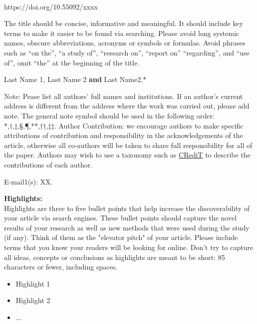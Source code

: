 \documentclass{ELSP}
\begin{document}
\begin{flushleft}
{\sffamily \small {}}\\
{\sffamily\small{https://doi.org/10.55092/xxxx}}


\newcontent The title should be concise, informative and meaningful. It should
include key terms to make it easier to be found via searching. Please
avoid long systemic names, obscure abbreviations, acronyms or symbols or
formulas. Avoid phrases such as ``on the'', ``a study of'', ``research
on'', ``report on'' ``regarding'', and ``use of'', omit ``the'' at the
beginning of the title.

 {Last Name} {1},
 {Last Name} {2}
\textbf{and} 
 {Last Name}{2,}{*}


\newcontent Note: Pease list all authors' full names and institutions. If an
author's current address is different from the address where the work
was carried out, please add note. The general note symbol should be used
in the following order: *,†,‡,§,¶,**,††,‡‡. Author Contribution:
we encourage authors to make specific attributions of contribution and
responsibility in the acknowledgements of the article, otherwise all
co-authors will be taken to share full responsibility for all of the
paper. Authors may wish to use a taxonomy such as
\href{http://credit.niso.org/}{CRediT} to describe the contributions of
each author.

 {E-mail1(s): XX.}
\end{flushleft}
\noindent\textbf{\textcolor[RGB]{0,131,255}{Highlights:}}\\
\newline
Highlights are three to five bullet points that help increase the discoverability of your article via search engines. These bullet points should capture the novel results of your research as well as new methods that were used during the study (if any). Think of them as the "elevator pitch" of your article. Please include terms that you know your readers will be looking for online. Don't try to capture all ideas, concepts or conclusions as highlights are meant to be short: 85 characters or fewer, including spaces.
\begin{itemize}
    \item Highlight 1
    \item Highlight 2
    \item ...
\end{itemize}
\end{document}
